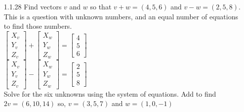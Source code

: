\documentclass[10pt,twoside,reqno]{article}
\begin{document}
\begin{enumerate}
\item[1.1.28] Find vectors $v$ and $w$ so that $ v + w = (4, 5, 6)$ and $v - w = (2, 5, 8)$. This is a question with \underline{\hspace{6mm}} unknown numbers, and an equal number of equations to find those numbers.\\
\vspace{3mm}
$\left[\begin{smallmatrix} X_{v}\\ Y_{v}\\ Z_{v} \end{smallmatrix} \right] + \left[\begin{smallmatrix} X_{w}\\ Y_{w}\\ Z_{w} \end{smallmatrix} \right] = \left[\begin{smallmatrix} 4\\ 5\\ 6\end{smallmatrix} \right]$\\
$\left[\begin{smallmatrix} X_{v}\\ Y_{v}\\ Z_{v} \end{smallmatrix} \right] - \left[\begin{smallmatrix} X_{w}\\ Y_{w}\\ Z_{w} \end{smallmatrix} \right] = \left[\begin{smallmatrix} 2\\ 5\\ 8\end{smallmatrix} \right]$\\
\vspace{2mm}
Solve for the six unknowns using the system of equations. Add to find $2v = (6, 10, 14)$ so, $v = (3, 5, 7)$ and $w = (1, 0, -1)$\\
\end{enumerate} 
\end{document}
